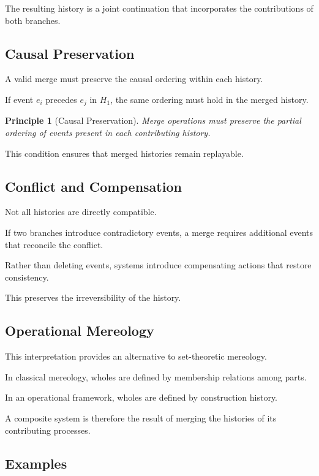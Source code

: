 \documentclass[12pt]{article}
\newtheorem{principle}{Principle}
\begin{document}
The resulting history is a joint continuation that
incorporates the contributions of both branches.

\subsection{Causal Preservation}

A valid merge must preserve the causal ordering
within each history.

If event $e_i$ precedes $e_j$ in $H_1$, the same ordering
must hold in the merged history.

\begin{principle}[Causal Preservation]
Merge operations must preserve the partial ordering
of events present in each contributing history.
\end{principle}

This condition ensures that merged histories remain
replayable.

\subsection{Conflict and Compensation}

Not all histories are directly compatible.

If two branches introduce contradictory events,
a merge requires additional events that reconcile
the conflict.

Rather than deleting events, systems introduce
compensating actions that restore consistency.

This preserves the irreversibility of the history.

\subsection{Operational Mereology}

This interpretation provides an alternative to
set-theoretic mereology.

In classical mereology, wholes are defined by
membership relations among parts.

In an operational framework, wholes are defined
by construction history.

A composite system is therefore the result of
merging the histories of its contributing processes.

\subsection{Examples}
\end{document}
